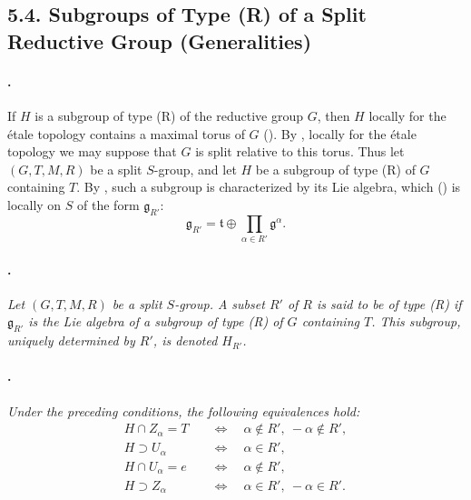 \subsection*{5.4. Subgroups of Type \textup{(R)} of a Split
Reductive Group \textup{(Generalities)}}

\paragraph{.}
If \(H\) is a subgroup of type \textup{(R)} of the reductive group
\(G\), then \(H\) locally for the étale topology contains a maximal
torus of \(G\) \textup{()}. By , locally for the étale
topology we may suppose that \(G\) is split relative to this torus.
Thus let \((G,T,M,R)\) be a split \(S\)-group, and let \(H\) be a
subgroup of type \textup{(R)} of \(G\) containing \(T\). By ,
such a subgroup is characterized by its Lie algebra, which
\textup{()} is locally on \(S\) of the form
\(\mathfrak g_{R'}\):
\[
  \mathfrak g_{R'}
  =
  \mathfrak t
  \oplus
  \prod_{\alpha\in R'}\mathfrak g^\alpha.
\]

\paragraph{.}
\textit{Let \((G,T,M,R)\) be a split \(S\)-group. A subset \(R'\)
of \(R\) is said to be of type \textup{(R)} if
\(\mathfrak g_{R'}\) is the Lie algebra of a subgroup of type
\textup{(R)} of \(G\) containing \(T\). This subgroup, uniquely
determined by \(R'\), is denoted \(H_{R'}\).}

\paragraph{.}
\textit{Under the preceding conditions, the following equivalences
hold:}
\[
\begin{aligned}
  H\cap Z_\alpha=T
    &\quad\Longleftrightarrow\quad
      \alpha\notin R',\ -\alpha\notin R',\\
  H\supset U_\alpha
    &\quad\Longleftrightarrow\quad
      \alpha\in R',\\
  H\cap U_\alpha=e
    &\quad\Longleftrightarrow\quad
      \alpha\notin R',\\
  H\supset Z_\alpha
    &\quad\Longleftrightarrow\quad
      \alpha\in R',\ -\alpha\in R'.
\end{aligned}
\]

